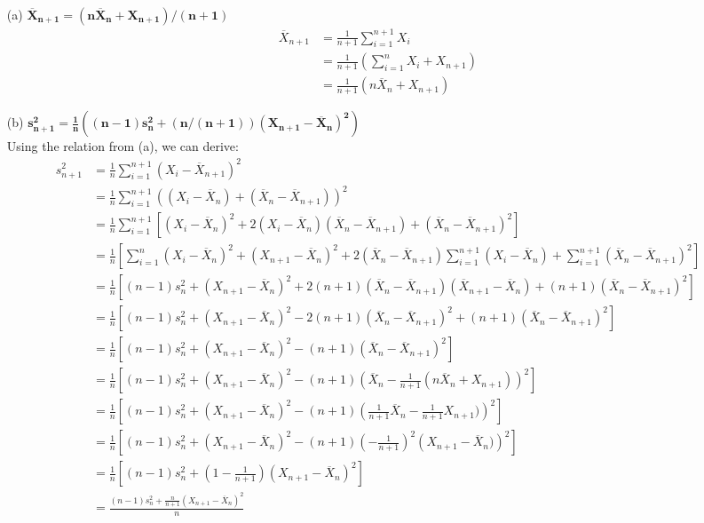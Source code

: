 \documentclass{article}
\newcommand{\olx}[1]{\overline{X}_{#1}}
\begin{document}
\begin{itemize}
	\item[(a)] $\mathbf{\overline{X}_{n+1}=(n\overline{X}_n + X_{n+1})/(n+1)}$ \\
		\begin{align*}
			\overline{X}_{n+1} 	&= \frac{1}{n+1}\sum_{i=1}^{n+1}X_i 	\\
								&= \frac{1}{n+1}\left(\sum_{i=1}^nX_i + X_{n+1}\right)	\\
								&= \frac{1}{n+1}\left(n\overline{X}_n + X_{n+1}\right)
		\end{align*}
	
	\item[(b)] $\mathbf{s^2_{n+1}=\frac{1}{n}((n-1)s_n^2+(n/(n+1))(X_{n+1}-\overline{X}_n)^2)}$ \\
	
		Using the relation from (a), we can derive:
		\begin{align*}
			s^2_{n+1} 	&= \frac{1}{n}\sum_{i=1}^{n+1}(X_i-\overline{X}_{n+1})^2 	\\
						&= \frac{1}{n}\sum_{i=1}^{n+1}\left((X_i-\olx{n})+(\olx{n}-\olx{n+1})\right)^2	\\
						&= \frac{1}{n}\sum_{i=1}^{n+1}\left[(X_i-\olx{n})^2+2(X_i-\olx{n})(\olx{n}-\olx{n+1})+(\olx{n}-\olx{n+1})^2\right]	\\
						&= \frac{1}{n}\left[\sum_{i=1}^{n}(X_i-\olx{n})^2 + (X_{n+1}-\olx{n})^2 +2(\olx{n}-\olx{n+1})\sum_{i=1}^{n+1}(X_i-\olx{n})
						+\sum_{i=1}^{n+1}(\olx{n}-\olx{n+1})^2\right]	\\
						&= \frac{1}{n}\left[(n-1)s^2_n + (X_{n+1}-\olx{n})^2 +2(n+1)(\olx{n}-\olx{n+1})(\olx{n+1}-\olx{n}) +(n+1)(\olx{n}-\olx{n+1})^2\right]	\\
						&= \frac{1}{n}\left[(n-1)s^2_n + (X_{n+1}-\olx{n})^2 -2(n+1)(\olx{n}-\olx{n+1})^2 +(n+1)(\olx{n}-\olx{n+1})^2\right]	\\
						&= \frac{1}{n}\left[(n-1)s^2_n + (X_{n+1}-\olx{n})^2 -(n+1)(\olx{n}-\olx{n+1})^2 \right]	\\
						&= \frac{1}{n}\left[(n-1)s^2_n + (X_{n+1}-\olx{n})^2 -(n+1)\left(\olx{n}-\frac{1}{n+1}(n\olx{n}+X_{n+1})\right)^2 \right]	\\
						&= \frac{1}{n}\left[(n-1)s^2_n + (X_{n+1}-\olx{n})^2 -(n+1)\left(\frac{1}{n+1}\olx{n}-\frac{1}{n+1}X_{n+1})\right)^2 \right]	\\
						&= \frac{1}{n}\left[(n-1)s^2_n + (X_{n+1}-\olx{n})^2 -(n+1)\left(-\frac{1}{n+1}\right)^2\left(X_{n+1}-\olx{n})\right)^2 \right]	\\
						&= \frac{1}{n}\left[(n-1)s^2_n + \left(1-\frac{1}{n+1}\right)(X_{n+1}-\olx{n})^2 \right]	\\
						&= \frac{(n-1)s^2_n + \frac{n}{n+1}(X_{n+1}-\olx{n})^2}{n}
		\end{align*}
	
\end{itemize}	
\end{document}
